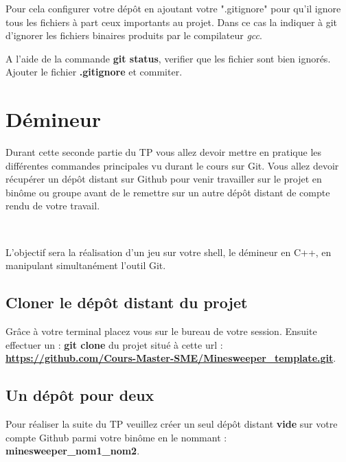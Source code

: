 Pour cela configurer votre dépôt en ajoutant votre ".gitignore" pour qu'il ignore tous les fichiers à part ceux importants au projet. Dans ce cas la indiquer à git d'ignorer les fichiers binaires produits par le compilateur \textit{gcc}.

\medskip

A l'aide de la commande \textbf{git status}, verifier que les fichier sont bien ignorés. Ajouter le fichier \textbf{.gitignore} et commiter.

\newpage 

\chapter{Démineur} 

Durant cette seconde partie du TP vous allez devoir mettre en pratique les différentes commandes principales vu durant le cours sur Git. Vous allez devoir récupérer un dépôt distant sur Github pour venir travailler sur le projet en binôme ou groupe avant de le remettre sur un autre dépôt distant de compte rendu de votre travail.

~

L'objectif sera la réalisation d'un jeu sur votre shell, le démineur en C++, en manipulant simultanément l'outil Git.

%
%
%
%
\section{Cloner le dépôt distant du projet}

Grâce à votre terminal placez vous sur le bureau de votre session. Ensuite effectuer un : \textbf{git clone} du projet situé à cette url : \textbf{\href{https://github.com/Cours-Master-SME/Minesweeper\_template.git}{https://github.com/Cours-Master-SME/Minesweeper\_template.git}}.

\section{Un dépôt pour deux}

Pour réaliser la suite du TP veuillez créer un seul dépôt distant \textbf{vide} sur votre compte Github parmi votre binôme en le nommant : \textbf{minesweeper\_nom1\_nom2}.

